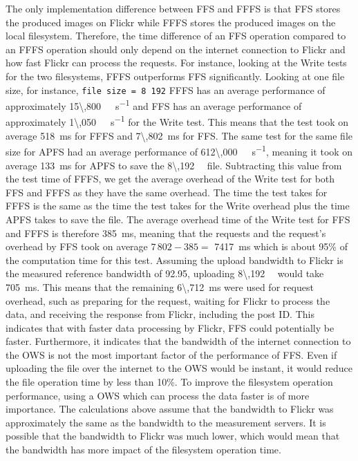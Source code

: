 The only implementation difference between \gls{FFS} and \gls{FFFS} is that \gls{FFS} stores the produced images on Flickr while \gls{FFFS} stores the produced images on the local filesystem. Therefore, the time difference of an \gls{FFS} operation compared to an \gls{FFFS} operation should only depend on the internet connection to Flickr and how fast Flickr can process the requests. For instance, looking at the Write tests for the two filesystems, \gls{FFFS} outperforms \gls{FFS} significantly. Looking at one file size, for instance, \texttt{file size = 8\,192} \gls{FFFS} has an average performance of approximately \SI[per-mode = symbol]{15\,800}{\kilo\byte\per\second} and \gls{FFS} has an average performance of approximately \SI[per-mode = symbol]{1\,050}{\kilo\byte\per\second} for the Write test. This means that the test took on average \SI{518}{\milli\second} for \gls{FFFS} and \SI{7\,802}{\milli\second} for \gls{FFS}. The same test for the same file size for \gls{APFS} had an average performance of \SI[per-mode = symbol]{612\,000}{\kilo\byte\per\second}, meaning it took on average \SI[per-mode = symbol]{133}{\milli\second} for \gls{APFS} to save the \SI[per-mode = symbol]{8\,192}{\kilo\byte} file. Subtracting this value from the test time of \gls{FFFS}, we get the average overhead of the Write test for both \gls{FFS} and \gls{FFFS} as they have the same overhead. The time the test takes for \gls{FFFS} is the same as the time the test takes for the Write overhead plus the time \gls{APFS} takes to save the file. The average overhead time of the Write test for \gls{FFS} and \gls{FFFS} is therefore \SI[per-mode = symbol]{385}{\milli\second}, meaning that the requests and the request's overhead by \gls{FFS} took on average $7\,802 - 385 =$ \SI{7417}{\milli\second} which is about 95\% of the computation time for this test. Assuming the upload bandwidth to Flickr is the measured reference bandwidth of \gls{92.95}{\mega\byte\per\second}, uploading \SI[per-mode = symbol]{8\,192}{\kilo\byte} would take \SI[per-mode = symbol]{705}{\milli\second}. This means that the remaining \SI[per-mode = symbol]{6\,712}{\milli\second} were used for request overhead, such as preparing for the request, waiting for Flickr to process the data, and receiving the response from Flickr, including the post ID. This indicates that with faster data processing by Flickr, \gls{FFS} could potentially be faster. Furthermore, it indicates that the bandwidth of the internet connection to the \gls{OWS} is not the most important factor of the performance of \gls{FFS}. Even if uploading the file over the internet to the \gls{OWS} would be instant, it would reduce the file operation time by less than 10\%. To improve the filesystem operation performance, using a \gls{OWS} which can process the data faster is of more importance. The calculations above assume that the bandwidth to Flickr was approximately the same as the bandwidth to the measurement servers. It is possible that the bandwidth to Flickr was much lower, which would mean that the bandwidth has more impact of the filesystem operation time.

